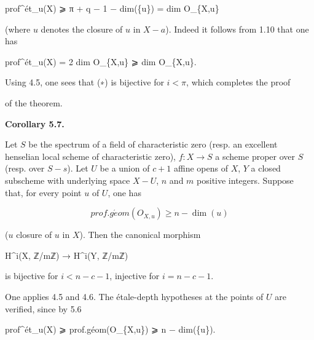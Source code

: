 \documentclass[
]{article}
\newenvironment{Shaded}{}{}
\newcommand{\NormalTok}[1]{#1}
\begin{document}
\begin{Shaded}
\begin{Highlighting}[]
\NormalTok{prof\^{}ét\_u(X) ⩾ π + q − 1 − dim(\{u\}) = dim O\_\{X,u\}}
\end{Highlighting}
\end{Shaded}

(where \({u}\) denotes the closure of \(u\) in \(X - {a}\)). Indeed it
follows from 1.10 that one has

\begin{Shaded}
\begin{Highlighting}[]
\NormalTok{prof\^{}ét\_u(X) = 2 dim O\_\{X,u\} ⩾ dim O\_\{X,u\}.}
\end{Highlighting}
\end{Shaded}

Using 4.5, one sees that (∗) is bijective for \(i < \pi\), which
completes the proof

of the theorem.

\textbf{Corollary 5.7.}

Let \(S\) be the spectrum of a field of characteristic zero (resp. an
excellent henselian local scheme of characteristic zero),
\(f : X \to S\) a scheme proper over \(S\) (resp. over \(S - {s}\)). Let
\(U\) be a union of \(c + 1\) affine opens of \(X\), \(Y\) a closed
subscheme with underlying space \(X - U\), \(n\) and \(m\) positive
integers. Suppose that, for every point \(u\) of \(U\), one has

\[
prof.g\acute{e}om(O_{X,u}) \geqslant n - \dim({u})
\]

(\({u}\) closure of \(u\) in \(X\)). Then the canonical morphism

\begin{Shaded}
\begin{Highlighting}[]
\NormalTok{H\^{}i(X, ℤ/mℤ) → H\^{}i(Y, ℤ/mℤ)}
\end{Highlighting}
\end{Shaded}

is bijective for \(i < n - c - 1\), injective for \(i = n - c - 1\).

One applies 4.5 and 4.6. The étale-depth hypotheses at the points of
\(U\) are verified, since by 5.6

\begin{Shaded}
\begin{Highlighting}[]
\NormalTok{prof\^{}ét\_u(X) ⩾ prof.géom(O\_\{X,u\}) ⩾ n − dim(\{u\}).}
\end{Highlighting}
\end{Shaded}
\end{document}
